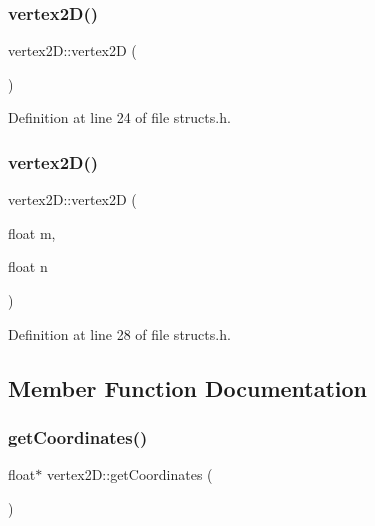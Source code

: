 \subsubsection{\texorpdfstring{vertex2\+D()}{vertex2D()}\hspace{0.1cm}{\footnotesize\ttfamily [1/2]}}
{\footnotesize\ttfamily vertex2\+D\+::vertex2D (\begin{DoxyParamCaption}{ }\end{DoxyParamCaption})\hspace{0.3cm}{\ttfamily [inline]}}



Definition at line 24 of file structs.\+h.

\mbox{\label{structvertex2_d_a146dcb0c51e1994fb61e92fdf943197c}} 
\subsubsection{\texorpdfstring{vertex2\+D()}{vertex2D()}\hspace{0.1cm}{\footnotesize\ttfamily [2/2]}}
{\footnotesize\ttfamily vertex2\+D\+::vertex2D (\begin{DoxyParamCaption}\item[{float}]{m,  }\item[{float}]{n }\end{DoxyParamCaption})\hspace{0.3cm}{\ttfamily [inline]}}



Definition at line 28 of file structs.\+h.



\subsection{Member Function Documentation}
\mbox{\label{structvertex2_d_abf1f2b45c9ea667e4b32618596e7f2b1}} 
\subsubsection{\texorpdfstring{get\+Coordinates()}{getCoordinates()}}
{\footnotesize\ttfamily float$\ast$ vertex2\+D\+::get\+Coordinates (\begin{DoxyParamCaption}{ }\end{DoxyParamCaption})\hspace{0.3cm}{\ttfamily [inline]}}



